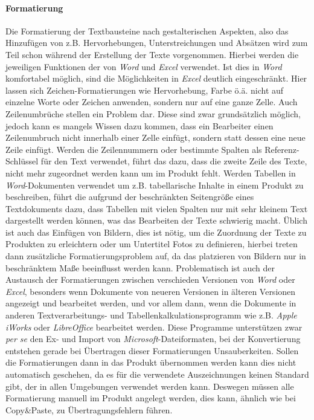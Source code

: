 \paragraph{Formatierung} Die Formatierung der Textbausteine nach gestalterischen Aspekten, also das Hinzufügen von z.B. Hervorhebungen, Unterstreichungen und Absätzen wird zum Teil schon während der Erstellung der Texte vorgenommen. Hierbei werden die jeweiligen Funktionen der von \emph{Word} und \emph{Excel} verwendet. Ist dies in \emph{Word} komfortabel möglich, sind die Möglichkeiten in \emph{Excel} deutlich eingeschränkt. Hier lassen sich Zeichen-Formatierungen wie Hervorhebung, Farbe ö.ä. nicht auf einzelne Worte oder Zeichen anwenden, sondern nur auf eine ganze Zelle. Auch Zeilenumbrüche stellen ein Problem dar. Diese sind zwar grundsätzlich möglich, jedoch kann es mangels Wissen dazu kommen, dass ein Bearbeiter einen Zeilenumbruch nicht innerhalb einer Zelle einfügt, sondern statt dessen eine neue Zeile einfügt. Werden die Zeilennummern oder bestimmte Spalten als Referenz-Schlüssel für den Text verwendet, führt das dazu, dass die zweite Zeile des Texte, nicht mehr zugeordnet werden kann um im Produkt fehlt. Werden Tabellen in \emph{Word}-Dokumenten verwendet um z.B. tabellarische Inhalte in einem Produkt zu beschreiben, führt die aufgrund der beschränkten Seitengröße eines Textdokuments dazu, dass Tabellen mit vielen Spalten nur mit sehr kleinem Text dargestellt werden können, was das Bearbeiten der Texte schwierig macht. Üblich ist auch das Einfügen von Bildern, dies ist nötig, um die Zuordnung der Texte zu Produkten zu erleichtern oder um Untertitel Fotos zu definieren, hierbei treten dann zusätzliche Formatierungsproblem auf, da das platzieren von Bildern nur in beschränktem Maße beeinflusst werden kann. Problematisch ist auch der Austausch der Formatierungen zwischen verschieden Versionen von \emph{Word} oder \emph{Excel}, besonders wenn Dokumente von neueren Versionen in älteren Versionen angezeigt und bearbeitet werden, und vor allem dann, wenn die Dokumente in anderen Textverarbeitungs- und Tabellenkalkulationsprogramm wie z.B. \emph{Apple} \emph{iWorks} oder \emph{LibreOffice} bearbeitet werden. Diese Programme unterstützen zwar \emph{per se} den Ex- und Import von \emph{Microsoft}-Dateiformaten, bei der Konvertierung entstehen gerade bei Übertragen dieser Formatierungen  Unsauberkeiten. Sollen die Formatierungen dann in das Produkt übernommen werden kann dies nicht automatisch geschehen, da es für die verwendete Auszeichnungen keinen Standard gibt, der in allen Umgebungen verwendet werden kann. Deswegen müssen alle Formatierung manuell im Produkt angelegt werden, dies kann, ähnlich wie bei Copy\&Paste, zu Übertragungsfehlern führen.

